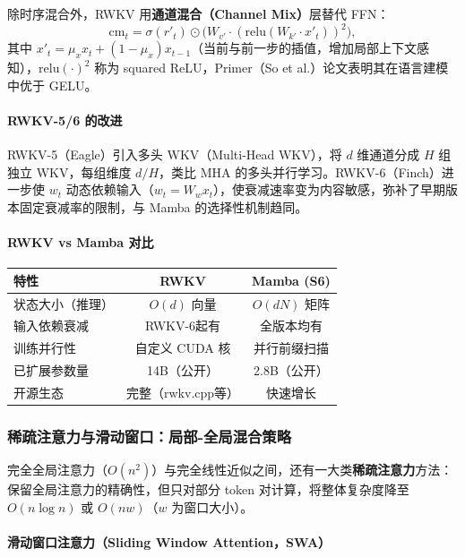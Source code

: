 \documentclass[12pt,a4paper]{article}
\begin{document}
除时序混合外，RWKV 用\textbf{通道混合（Channel Mix）}层替代 FFN：
\begin{equation}
\text{cm}_t = \sigma(r'_t) \odot \bigl(W_{v'} \cdot (\mathrm{relu}(W_{k'} \cdot x'_t))^2\bigr),
\end{equation}
其中 $x'_t = \mu_x x_t + (1-\mu_x) x_{t-1}$（当前与前一步的插值，增加局部上下文感知），$\mathrm{relu}(\cdot)^2$ 称为 squared ReLU，Primer（So et al.）论文表明其在语言建模中优于 GELU。

\paragraph{RWKV-5/6 的改进}

RWKV-5（Eagle）引入多头 WKV（Multi-Head WKV），将 $d$ 维通道分成 $H$ 组独立 WKV，每组维度 $d/H$，类比 MHA 的多头并行学习。RWKV-6（Finch）进一步使 $w_t$ 动态依赖输入（$w_t = W_w x_t$），使衰减速率变为内容敏感，弥补了早期版本固定衰减率的限制，与 Mamba 的选择性机制趋同。

\paragraph{RWKV vs Mamba 对比}

\begin{center}
\begin{tabular}{lcc}
\hline
\textbf{特性} & \textbf{RWKV} & \textbf{Mamba (S6)} \\
\hline
状态大小（推理） & $O(d)$ 向量 & $O(dN)$ 矩阵 \\
输入依赖衰减 & RWKV-6起有 & 全版本均有 \\
训练并行性 & 自定义 CUDA 核 & 并行前缀扫描 \\
已扩展参数量 & 14B（公开） & 2.8B（公开） \\
开源生态 & 完整（rwkv.cpp等） & 快速增长 \\
\hline
\end{tabular}
\end{center}

\subsubsection{稀疏注意力与滑动窗口：局部-全局混合策略}
\label{sec:sparse-attn}

完全全局注意力（$O(n^2)$）与完全线性近似之间，还有一大类\textbf{稀疏注意力}方法：保留全局注意力的精确性，但只对部分 token 对计算，将整体复杂度降至 $O(n \log n)$ 或 $O(nw)$（$w$ 为窗口大小）。

\paragraph{滑动窗口注意力（Sliding Window Attention，SWA）}
\end{document}
